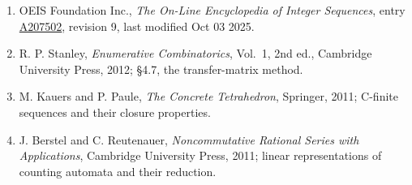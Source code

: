 \documentclass[11pt]{article}
\theoremstyle{definition}
\begin{document}
\begin{enumerate}

\item OEIS Foundation Inc., \emph{The On-Line Encyclopedia of Integer Sequences}, entry \href{https://oeis.org/A207502}{A207502}, revision 9, last modified Oct 03 2025.

\item R. P. Stanley, \emph{Enumerative Combinatorics}, Vol.~1, 2nd ed., Cambridge University Press, 2012; \S4.7, the transfer-matrix method.

\item M. Kauers and P. Paule, \emph{The Concrete Tetrahedron}, Springer, 2011; C-finite sequences and their closure properties.

\item J. Berstel and C. Reutenauer, \emph{Noncommutative Rational Series with Applications}, Cambridge University Press, 2011; linear representations of counting automata and their reduction.

\end{enumerate}
\end{document}
